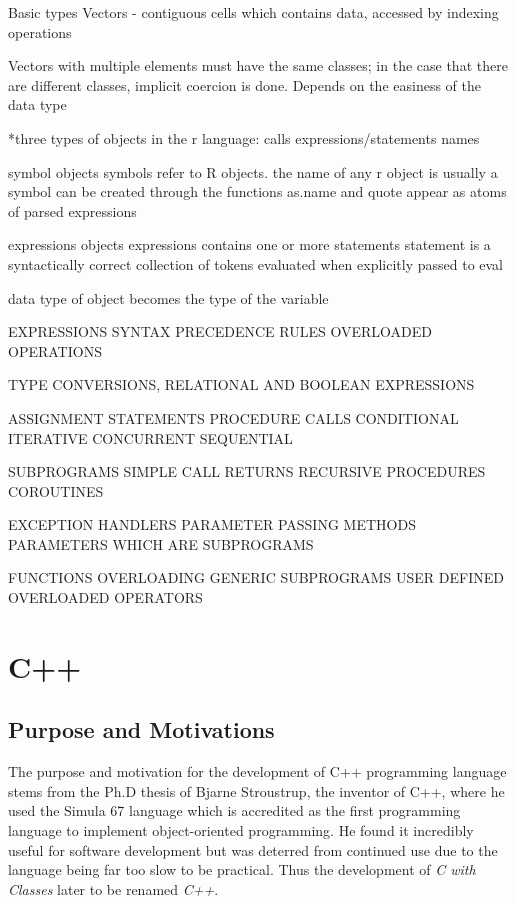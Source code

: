 \documentclass[12pt]{article}
\begin{document}
Basic types
Vectors - contiguous cells which contains data, accessed by indexing operations

Vectors with multiple elements must have the same classes; in the case that there are different classes, implicit coercion is done. Depends on the easiness of the data type

*three types of objects in the r language:
calls
expressions/statements
names

symbol objects
symbols refer to R objects. the name of any r object is usually a symbol
can be created through the functions as.name and quote
appear as atoms of parsed expressions

expressions objects
expressions contains one or more statements
statement is a syntactically correct collection of tokens
evaluated when explicitly passed to eval

data type of object becomes the type of the variable




EXPRESSIONS
SYNTAX
PRECEDENCE RULES
OVERLOADED OPERATIONS

TYPE CONVERSIONS, RELATIONAL AND BOOLEAN EXPRESSIONS

ASSIGNMENT STATEMENTS
PROCEDURE CALLS
CONDITIONAL
ITERATIVE
CONCURRENT
SEQUENTIAL

SUBPROGRAMS
SIMPLE CALL RETURNS
RECURSIVE PROCEDURES
COROUTINES

EXCEPTION HANDLERS
PARAMETER PASSING METHODS
PARAMETERS WHICH ARE SUBPROGRAMS

FUNCTIONS OVERLOADING
GENERIC SUBPROGRAMS
USER DEFINED OVERLOADED OPERATORS

\fi


\section{C++}
\subsection{Purpose and Motivations}
The purpose and motivation for the development of C++ programming language stems from the Ph.D thesis of Bjarne Stroustrup, the
inventor of C++, where he used the Simula 67 language which is accredited as the first programming language to implement 
object-oriented programming. He found it incredibly useful for software development but was deterred from continued use
due to the language being far too slow to be practical. Thus the development of \textit{C with Classes} later to be renamed \textit{C++}.
\end{document}
